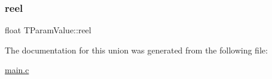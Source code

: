 \mbox{\label{unionTParamValue_a6c6e99a421de592ad46cf47aab9cef58}} 
\subsubsection{\texorpdfstring{reel}{reel}}
{\footnotesize\ttfamily float T\+Param\+Value\+::reel}



The documentation for this union was generated from the following file\+:\begin{DoxyCompactItemize}
\item 
\hyperlink{main_8c}{main.\+c}\end{DoxyCompactItemize}
